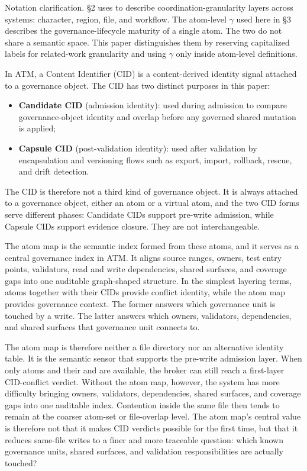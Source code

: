 \documentclass[9pt,letterpaper]{extarticle}
\begin{document}
Notation clarification. §2 uses \texttt{} to describe coordination-granularity layers across systems: character, region, file, and workflow. The atom-level $\gamma$ used here in §3 describes the governance-lifecycle maturity of a single atom. The two do not share a semantic space. This paper distinguishes them by reserving capitalized \texttt{} labels for related-work granularity and using $\gamma$ only inside atom-level definitions.

In ATM, a Content Identifier (CID) is a content-derived identity signal attached to a governance object. The CID has two distinct purposes in this paper:

\begin{itemize}
\item \textbf{Candidate CID} (admission identity): used during admission to compare governance-object identity and overlap before any governed shared mutation is applied;
\item \textbf{Capsule CID} (post-validation identity): used after validation by encapsulation and versioning flows such as export, import, rollback, rescue, and drift detection.
\end{itemize}

The CID is therefore not a third kind of governance object. It is always attached to a governance object, either an atom or a virtual atom, and the two CID forms serve different phases: Candidate CIDs support pre-write admission, while Capsule CIDs support evidence closure. They are not interchangeable.

The atom map is the semantic index formed from these atoms, and it serves as a central governance index in ATM. It aligns source ranges, owners, test entry points, validators, read and write dependencies, shared surfaces, and coverage gaps into one auditable graph-shaped structure. In the simplest layering terms, atoms together with their CIDs provide conflict identity, while the atom map provides governance context. The former answers which governance unit is touched by a write. The latter answers which owners, validators, dependencies, and shared surfaces that governance unit connects to.

The atom map is therefore neither a file directory nor an alternative identity table. It is the semantic sensor that supports the pre-write admission layer. When only atoms and their \texttt{} and \texttt{} are available, the broker can still reach a first-layer CID-conflict verdict. Without the atom map, however, the system has more difficulty bringing owners, validators, dependencies, shared surfaces, and coverage gaps into one auditable index. Contention inside the same file then tends to remain at the coarser atom-set or file-overlap level. The atom map's central value is therefore not that it makes CID verdicts possible for the first time, but that it reduces same-file writes to a finer and more traceable question: which known governance units, shared surfaces, and validation responsibilities are actually touched?
\end{document}
